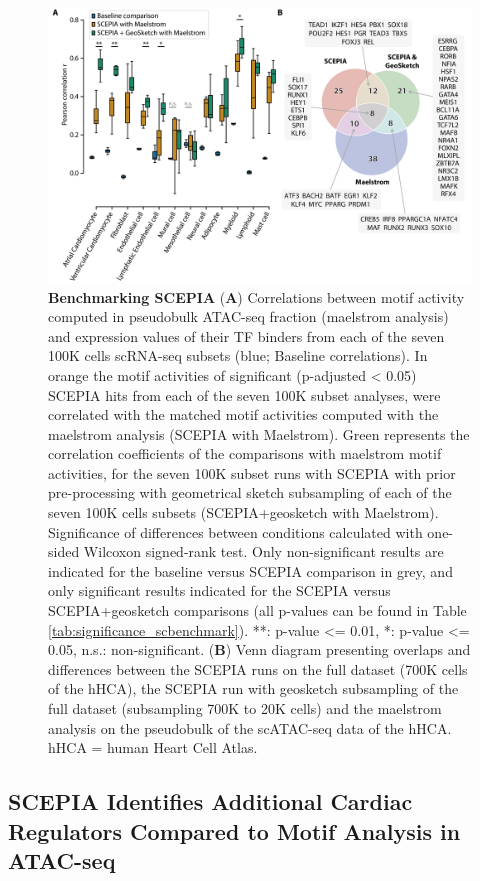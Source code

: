 \begin{figure}
    \centering
    \includegraphics[width=0.75\linewidth]{ch.scepia/imgs/OverlappingHitsBetweenSCEPIAGEOANDMAELSTROM_BlackMyriad_onlySign_baselineNS_v11_Figure4.png}
    \caption{\textbf{Benchmarking SCEPIA} (\textbf{A}) Correlations between motif activity computed in pseudobulk ATAC-seq fraction (maelstrom analysis) and expression values of their TF binders from each of the seven 100K cells scRNA-seq subsets (blue; Baseline correlations). In orange the motif activities of significant (p-adjusted < 0.05) SCEPIA hits from each of the seven 100K subset analyses, were correlated with the matched motif activities computed with the maelstrom analysis (SCEPIA with Maelstrom). Green represents the correlation coefficients of the comparisons with maelstrom motif activities, for the seven 100K subset runs with SCEPIA with prior pre-processing with geometrical sketch subsampling of each of the seven 100K cells subsets (SCEPIA+geosketch with Maelstrom). Significance of differences between conditions calculated with one-sided Wilcoxon signed-rank test. Only non-significant results are indicated for the baseline versus SCEPIA comparison in grey, and only significant results indicated for the SCEPIA versus SCEPIA+geosketch comparisons (all p-values can be found in Table \ref{tab:significance_scbenchmark}).  **: p-value <= 0.01, *: p-value <= 0.05, n.s.: non-significant. (\textbf{B}) Venn diagram presenting overlaps and differences between the SCEPIA runs on the full dataset (700K cells of the hHCA), the SCEPIA run with geosketch subsampling of the full dataset (subsampling 700K to 20K cells) and the maelstrom analysis on the pseudobulk of the scATAC-seq data of the hHCA. hHCA = human Heart Cell Atlas.}
    \label{fig:sc_benchmark}
\end{figure}

\subsection{SCEPIA Identifies Additional Cardiac Regulators Compared to Motif Analysis in ATAC-seq} 


